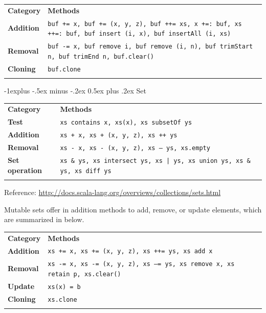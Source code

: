 \documentclass[a4paper,twoside,10pt,landscape]{article}
\makeatletter
\renewcommand{\subsection}{\@startsection{subsection}{2}{0mm}%
                                {-1explus -.5ex minus -.2ex}%
                                {0.5ex plus .2ex}%
                                {\normalfont\normalsize\bfseries}}
\makeatother
\begin{document}
\begin{multicols}{3}
\begin{center}
\begin{tabular}{@{}lp{6.5cm}@{}}
\hline\noalign{\smallskip}
\textbf{Category} & \textbf{Methods} \\
\noalign{\smallskip}\hline\noalign{\smallskip}
\textbf{Addition} & \texttt{buf += x, buf += (x, y, z), buf ++= xs, x +=: buf, xs ++=: buf, buf insert (i, x), buf insertAll (i, xs)}\\
\textbf{Removal} & \texttt{buf -= x, buf remove i, buf remove (i, n), buf trimStart n, buf trimEnd n, buf.clear()}\\
\textbf{Cloning} & \texttt{buf.clone}\\
\noalign{\smallskip}\hline
\end{tabular}
\end{center}


\subsection{Set}
\begin{center}
\begin{tabular}{@{}lp{6.5cm}@{}}
\hline\noalign{\smallskip}
\textbf{Category} & \textbf{Methods} \\
\noalign{\smallskip}\hline\noalign{\smallskip}
\textbf{Test} & \texttt{xs contains x, xs(x), xs subsetOf ys}\\
\textbf{Addition} & \texttt{xs + x, xs + (x, y, z), xs ++ ys}\\
\textbf{Removal} & \texttt{xs - x, xs - (x, y, z), xs -- ys, xs.empty}\\
\textbf{Set operation} & \texttt{xs \& ys, xs intersect ys, xs | ys, xs union ys, xs \&~ ys, xs diff ys}\\
\noalign{\smallskip}\hline
\end{tabular}
Reference: \url{http://docs.scala-lang.org/overviews/collections/sets.html}
\end{center}

Mutable sets offer in addition methods to add, remove, or update elements, which are summarized in below.

\begin{center}
\begin{tabular}{@{}lp{6.5cm}@{}}
\hline\noalign{\smallskip}
\textbf{Category} & \textbf{Methods} \\
\noalign{\smallskip}\hline\noalign{\smallskip}
\textbf{Addition} & \texttt{xs += x, xs += (x, y, z), xs ++= ys, xs add x}\\
\textbf{Removal} & \texttt{xs -= x, xs -= (x, y, z), xs --= ys, xs remove x, xs retain p, xs.clear()}\\
\textbf{Update} & \texttt{xs(x) = b}\\
\textbf{Cloning} & \texttt{xs.clone}\\
\noalign{\smallskip}\hline
\end{tabular}
\end{center}



\end{multicols}
\end{document}

